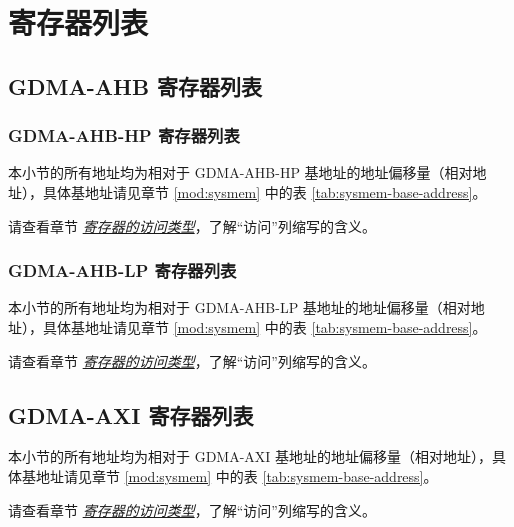 \documentclass[main\_\_CN.tex]{subfiles}
\begin{document}
\newpage
\begin{landscape}
\hypertarget{dma-reg-summ}{}
\section{寄存器列表}
\label{sec:dma-reg-summ}

\subsection{GDMA-AHB 寄存器列表}
\subsubsection{GDMA-AHB-HP 寄存器列表}

本小节的所有地址均为相对于 GDMA-AHB-HP 基地址的地址偏移量（相对地址），具体基地址请见章节 \ref{mod:sysmem} \textit{} 中的表 \ref{tab:sysmem-base-address}。

请查看章节 \hyperref[glossary-access-types]{\textit{寄存器的访问类型}}，了解“访问”列缩写的含义。




\subsubsection{GDMA-AHB-LP 寄存器列表}

本小节的所有地址均为相对于 GDMA-AHB-LP 基地址的地址偏移量（相对地址），具体基地址请见章节 \ref{mod:sysmem} \textit{} 中的表 \ref{tab:sysmem-base-address}。

请查看章节 \hyperref[glossary-access-types]{\textit{寄存器的访问类型}}，了解“访问”列缩写的含义。


\subsection{GDMA-AXI 寄存器列表}

本小节的所有地址均为相对于 GDMA-AXI 基地址的地址偏移量（相对地址），具体基地址请见章节 \ref{mod:sysmem} \textit{} 中的表 \ref{tab:sysmem-base-address}。

请查看章节 \hyperref[glossary-access-types]{\textit{寄存器的访问类型}}，了解“访问”列缩写的含义。


\end{landscape}

\end{document}
